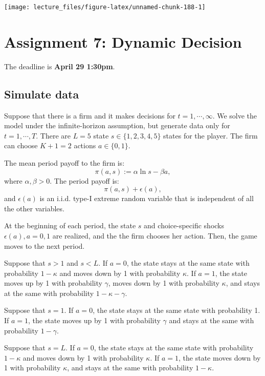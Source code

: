 \documentclass[
]{book}
\begin{document}
\begin{center}\texttt{[image: lecture\_files/figure-latex/unnamed-chunk-188-1]} \end{center}

\hypertarget{assignment7}{%
\chapter{Assignment 7: Dynamic Decision}\label{assignment7}}

The deadline is \textbf{April 29 1:30pm}.

\hypertarget{simulate-data}{%
\section{Simulate data}\label{simulate-data}}

Suppose that there is a firm and it makes decisions for \(t = 1, \cdots, \infty\). We solve the model under the infinite-horizon assumption, but generate data only for \(t = 1, \cdots, T\). There are \(L = 5\) state \(s \in \{1, 2, 3, 4, 5\}\) states for the player. The firm can choose \(K + 1 = 2\) actions \(a \in \{0, 1\}\).

The mean period payoff to the firm is:
\[
\pi(a, s) :=  \alpha \ln s - \beta a,
\]
where \(\alpha, \beta > 0\). The period payoff is:
\[
\pi(a, s) + \epsilon(a),
\]
and \(\epsilon(a)\) is an i.i.d. type-I extreme random variable that is independent of all the other variables.

At the beginning of each period, the state \(s\) and choice-specific shocks \(\epsilon(a), a = 0, 1\) are realized, and the the firm chooses her action. Then, the game moves to the next period.

Suppose that \(s > 1\) and \(s < L\). If \(a = 0\), the state stays at the same state with probability \(1 - \kappa\) and moves down by 1 with probability \(\kappa\). If \(a = 1\), the state moves up by 1 with probability \(\gamma\), moves down by 1 with probability \(\kappa\), and stays at the same with probability \(1 - \kappa - \gamma\).

Suppose that \(s = 1\). If \(a = 0\), the state stays at the same state with probability 1. If \(a = 1\), the state moves up by 1 with probability \(\gamma\) and stays at the same with probability \(1 - \gamma\).

Suppose that \(s = L\). If \(a = 0\), the state stays at the same state with probability \(1 - \kappa\) and moves down by 1 with probability \(\kappa\). If \(a = 1\), the state moves down by 1 with probability \(\kappa\), and stays at the same with probability \(1 - \kappa\).
\end{document}
